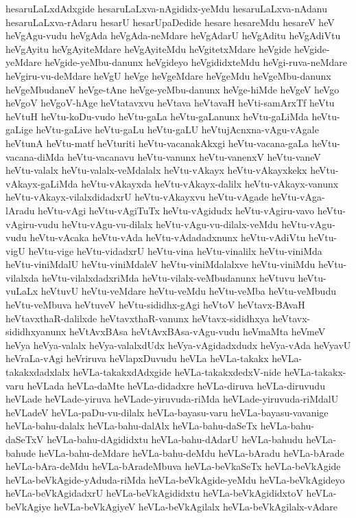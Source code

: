 {hesaruLaLxdAdxgide
hesaruLaLxva-nAgididx-yeMdu
hesaruLaLxva-nAdanu
hesaruLaLxva-rAdaru
hesarU
hesarUpaDedide
hesare
hesareMdu
hesareV
heV
heVgAgu-vudu
heVgAda
heVgAda-neMdare
heVgAdarU
heVgAditu
heVgAdiVtu
heVgAyitu
heVgAyiteMdare
heVgAyiteMdu
heVgitetxMdare
heVgide
heVgide-yeMdare
heVgide-yeMbu-danunx
heVgideyo
heVgididxteMdu
heVgi-ruva-neMdare
heVgiru-vu-deMdare
heVgU
heVge
heVgeMdare
heVgeMdu
heVgeMbu-danunx
heVgeMbudaneV
heVge-tAne
heVge-yeMbu-danunx
heVge-hiMde
heVgeV
heVgo
heVgoV
heVgoV-hAge
heVtatavxvu
heVtava
heVtavaH
heVti-samArxTf
heVtu
heVtuH
heVtu-koDu-vudo
heVtu-gaLa
heVtu-gaLanunx
heVtu-gaLiMda
heVtu-gaLige
heVtu-gaLive
heVtu-gaLu
heVtu-gaLU
heVtujAcnxna-vAgu-vAgale
heVtunA
heVtu-matf
heVturiti
heVtu-vacanakAkxgi
heVtu-vacana-gaLa
heVtu-vacana-diMda
heVtu-vacanavu
heVtu-vanunx
heVtu-vanenxV
heVtu-vaneV
heVtu-valalx
heVtu-valalx-veMdalalx
heVtu-vAkayx
heVtu-vAkayxkekx
heVtu-vAkayx-gaLiMda
heVtu-vAkayxda
heVtu-vAkayx-dalilx
heVtu-vAkayx-vanunx
heVtu-vAkayx-vilalxdidadxrU
heVtu-vAkayxvu
heVtu-vAgade
heVtu-vAga-lAradu
heVtu-vAgi
heVtu-vAgiTuTx
heVtu-vAgidudx
heVtu-vAgiru-vavo
heVtu-vAgiru-vudu
heVtu-vAgu-vu-dilalx
heVtu-vAgu-vu-dilalx-veMdu
heVtu-vAgu-vudu
heVtu-vAcaka
heVtu-vAda
heVtu-vAdadadxnunx
heVtu-vAdiVtu
heVtu-vigU
heVtu-vige
heVtu-vidadxrU
heVtu-vina
heVtu-vinalilx
heVtu-viniMda
heVtu-viniMdalU
heVtu-viniMdaleV
heVtu-viniMdalalxve
heVtu-viniMdu
heVtu-vilalxda
heVtu-vilalxdadxriMda
heVtu-vilalx-veMbudanunx
heVtuvu
heVtu-vuLaLx
heVtuvU
heVtu-veMdare
heVtu-veMdu
heVtu-veMba
heVtu-veMbudu
heVtu-veMbuva
heVtuveV
heVtu-sididhx-gAgi
heVtoV
heVtavx-BAvaH
heVtavxthaR-dalilxde
heVtavxthaR-vanunx
heVtavx-sididhxya
heVtavx-sididhxyanunx
heVtAvxBAsa
heVtAvxBAsa-vAgu-vudu
heVmaMta
heVmeV
heVya
heVya-valalx
heVya-valalxdUdx
heVya-vAgidadxdudx
heVya-vAda
heVyavU
heVraLa-vAgi
heVriruva
heVlapxDuvudu
heVLa
heVLa-takakx
heVLa-takakxdadxlalx
heVLa-takakxdAdxgide
heVLa-takakxdedxV-nide
heVLa-takakx-varu
heVLada
heVLa-daMte
heVLa-didadxre
heVLa-diruva
heVLa-diruvudu
heVLade
heVLade-yiruva
heVLade-yiruvuda-riMda
heVLade-yiruvuda-riMdalU
heVLadeV
heVLa-paDu-vu-dilalx
heVLa-bayasu-varu
heVLa-bayasu-vavanige
heVLa-bahu-dalalx
heVLa-bahu-dalAlx
heVLa-bahu-daSeTx
heVLa-bahu-daSeTxV
heVLa-bahu-dAgididxtu
heVLa-bahu-dAdarU
heVLa-bahudu
heVLa-bahude
heVLa-bahu-deMdare
heVLa-bahu-deMdu
heVLa-bAradu
heVLa-bArade
heVLa-bAra-deMdu
heVLa-bAradeMbuva
heVLa-beVkaSeTx
heVLa-beVkAgide
heVLa-beVkAgide-yAduda-riMda
heVLa-beVkAgide-yeMdu
heVLa-beVkAgideyo
heVLa-beVkAgidadxrU
heVLa-beVkAgididxtu
heVLa-beVkAgididxtoV
heVLa-beVkAgiye
heVLa-beVkAgiyeV
heVLa-beVkAgilalx
heVLa-beVkAgilalx-vAdare
}
